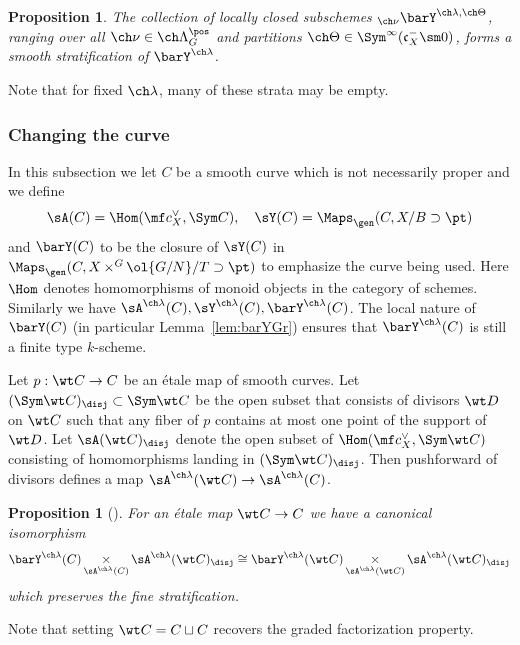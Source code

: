 \documentclass[final]{amsart}
\newtheorem{prop}[subsubsection]{Proposition}
\theoremstyle{remark}
\theoremstyle{definition}
\DeclareMathOperator*{\xt}{\times}
\numberwithin{equation}{section}
\begin{document}
\begin{prop}  \label{prop:barYstrata}
The collection of locally closed subschemes 
${}_{\ch\nu} \barY^{\ch\lambda,\ch\Theta}$, ranging over all $\ch\nu\in \ch\Lambda^\pos_G$ and partitions $\ch\Theta \in \Sym^\infty(\mathfrak c_X^-\sm 0)$, 
forms a smooth stratification of $\barY^{\ch\lambda}$. 
\end{prop}

Note that for fixed $\ch\lambda$, many of these strata may be empty.


\subsubsection{Changing the curve}

In this subsection we let $C$ be a smooth curve which is not necessarily proper 
and we define 
\[ \sA(C) = \Hom( \mf c_X^\vee, \Sym C), \quad 
\sY(C)=\Maps_\gen(C, X/B\supset \pt) \]
and $\barY(C)$ to be the closure
of $\sY(C)$ in $\Maps_\gen(C, X \xt^G \ol{G/N}/T \supset \pt)$ to emphasize
the curve being used. 
Here $\Hom$ denotes homomorphisms of monoid objects in the category of schemes.
Similarly we have $\sA^{\ch\lambda}(C), \sY^{\ch\lambda}(C),\barY^{\ch\lambda}(C)$. 
The local nature of $\barY(C)$ 
(in particular Lemma~\ref{lem:barYGr}) ensures that $\barY^{\ch\lambda}(C)$ is still 
a finite type $k$-scheme. 

\smallskip

Let $p: \wt C \to C$ be an \'etale map of smooth curves. 
Let $(\Sym \wt C)_\disj \subset \Sym \wt C$
be the open subset that consists of divisors $\wt D$ on $\wt C$ such that
any fiber of $p$ contains at most one point of the support of $\wt D$.
Let $\sA(\wt C)_\disj$ denote the open subset of 
$\Hom(\mf c_X^\vee, \Sym \wt C)$ consisting of homomorphisms landing in $(\Sym \wt C)_\disj$.
Then pushforward of divisors defines a map 
$\sA^{\ch\lambda}(\wt C) \to \sA^{\ch\lambda}(C)$.

\begin{prop}[{\cite[Proposition 2.19]{BFG}}] \label{prop:changecurve}
For an \'etale map $\wt C \to C$ we have a canonical isomorphism 
\[ \barY^{\ch\lambda}(C) \xt_{\sA^{\ch\lambda}(C)} \sA^{\ch\lambda}(\wt C)_\disj 
\cong \barY^{\ch\lambda}(\wt C) \xt_{\sA^{\ch\lambda}(\wt C)} \sA^{\ch\lambda}(\wt C)_\disj 
\] 
which preserves the fine stratification. 
\end{prop}
Note that setting $\wt C = C\sqcup C$ recovers the graded factorization property. 
\end{document}

